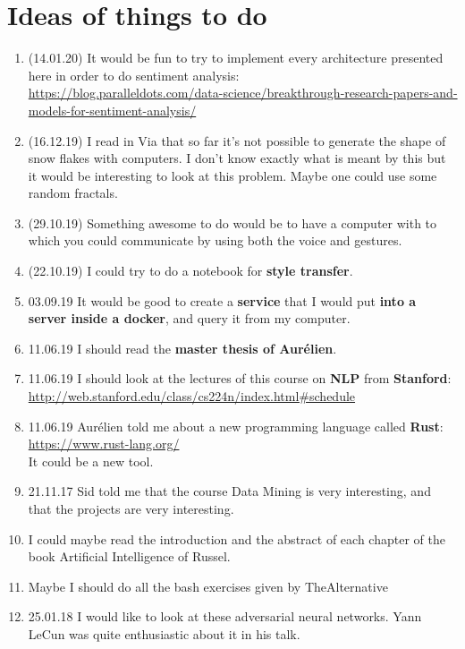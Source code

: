 \documentclass[11pt,a4paper]{article}
\begin{document}
\section{Ideas of things to do}
\begin{enumerate}
\item (14.01.20) It would be fun to try to implement every architecture presented here in order to do sentiment analysis:\\
\url{https://blog.paralleldots.com/data-science/breakthrough-research-papers-and-models-for-sentiment-analysis/}
\item (16.12.19) I read in Via that so far it's not possible to generate the shape of snow flakes with computers. I don't know exactly what is meant by this but it would be interesting to look at this problem. Maybe one could use some random fractals.
\item (29.10.19) Something awesome to do would be to have a computer with to which you could communicate by using both the voice and gestures.
\item (22.10.19) I could try to do a notebook for \textbf{style transfer}.
\item 03.09.19 It would be good to create a \textbf{service} that I would put \textbf{into a server inside a docker}, and query it from my computer.
\item 11.06.19 I should read the \textbf{master thesis of Aurélien}.
\item 11.06.19 I should look at the lectures of this course on \textbf{NLP} from \textbf{Stanford}:\\
\url{http://web.stanford.edu/class/cs224n/index.html#schedule}
\item 11.06.19 Aurélien told me about a new programming language called \textbf{Rust}:\\
\url{https://www.rust-lang.org/}\\
It could be a new tool.
\item 21.11.17 Sid told me that the course Data Mining is very interesting, and that the projects are very interesting.
\item I could maybe read the introduction and the abstract of each chapter of the book Artificial Intelligence of Russel.
\item Maybe I should do all the bash exercises given by TheAlternative
\item 25.01.18 I would like to look at these adversarial neural networks. Yann LeCun was quite enthusiastic about it in his talk.
\end{enumerate}
\end{document}
